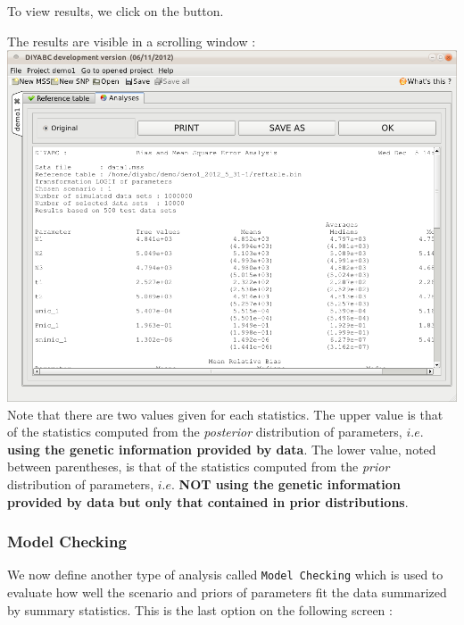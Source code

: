 To view results, we click on the   button. 

\newpage

The results are visible in a scrolling window :\\

\includegraphics[scale=0.32]{gui_pictures/Capture-DIYABC-52a.png} \\

Note that there are two values given for each statistics. The upper value is that of the statistics computed from the \emph{posterior} distribution of parameters, $i.e.$ \textbf{using the genetic information provided by data}. The lower value, noted between parentheses, is that of the statistics computed from the \emph{prior} distribution of parameters, $i.e.$ \textbf{NOT using the genetic information provided by data but only that contained in prior distributions}.  

\subsubsection{Model Checking}
We now define another type of analysis called \texttt{Model Checking} which is used to evaluate how well the scenario and priors of parameters fit the data summarized by summary statistics. This is the last option on the following screen :\\

